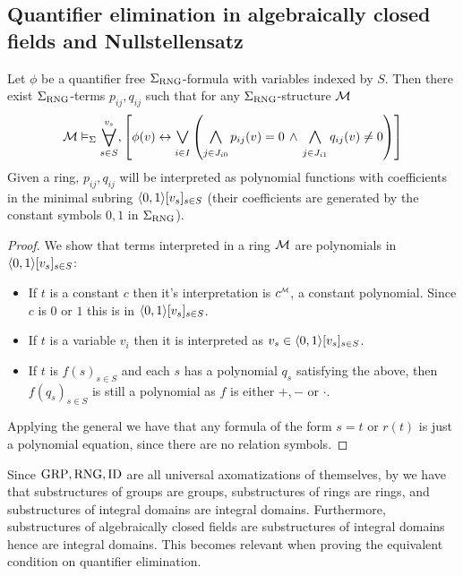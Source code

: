 \subsection{Quantifier elimination in algebraically closed fields
and Nullstellensatz}

\begin{lem}
    Let $\phi$ be a quantifier free $\Sigma_{\mathrm{RNG}}$-formula with variables indexed
    by $S$.
    Then there exist $\Sigma_{\mathrm{RNG}}$-terms
    $p_{ij}, q_{ij}$ such that
    for any $\Sigma_{\mathrm{RNG}}$-structure $\mathcal{M}$
    \[ 
        \MM \model{\Si} \bigforall{s \in S}{v_s}, \sqbrkt{\phi(v) 
        \IFF \bigor{i \in I}{} 
        \brkt{\bigand{j \in J_{i0}}{} p_{ij}(v) = 0 \AND 
        \bigand{j \in J_{i1}}{} q_{ij}(v) \ne 0}}
    \]
    Given a ring, $p_{ij},q_{ij}$ will be interpreted as polynomial
    functions with coefficients in the minimal subring $\langle0,1\rangle[v_s]_{s \in S}$
    (their coefficients are generated by the constant symbols $0,1$ 
    in $\Sigma_{\mathrm{RNG}}$).
\end{lem}
\begin{proof}
    We show that terms interpreted in a ring $\mathcal{M}$ 
    are polynomials in $\langle0,1\rangle[v_s]_{s \in S}$:
    \begin{itemize}
        \item If $t$ is a constant $c$ then it's interpretation is
            $\modintp{\MM}{c}$, a constant polynomial. 
            Since $c$ is $0$ or $1$ this is in $\langle0,1\rangle[v_s]_{s \in S}$.
        \item If $t$ is a variable $v_i$ then it is interpreted as
            $v_s \in \langle0,1\rangle[v_s]_{s \in S}$.
        \item If $t$ is $f(s)_{s \in S}$ and each $s$ has a polynomial $q_s$
            satisfying the above, 
            then $f(q_s)_{s \in S}$ 
            is still a polynomial as $f$ is either $+,-$ or $\cdot$.
    \end{itemize} 

    Applying the general 
     we have that
    any formula of the form $s = t$ or $r(t)$ is just a polynomial equation, 
    since there are no relation symbols.
\end{proof}

\begin{rmk}
    Since $\operatorname{GRP}, \mathrm{RNG}, \operatorname{ID}$ are all universal axomatizations of themselves,
    by  we have that
    substructures of groups are groups, 
    substructures of rings are rings, 
    and substructures of integral domains are integral domains.
    Furthermore, 
    substructures of algebraically closed fields are 
    substructures of integral domains hence are integral domains.
    This becomes relevant when proving the equivalent condition on quantifier
    elimination.
\end{rmk}

